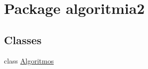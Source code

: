 \hypertarget{namespacealgoritmia2}{}\section{Package algoritmia2}
\label{namespacealgoritmia2}
\subsection*{Classes}
\begin{DoxyCompactItemize}
\item 
class \mbox{\hyperlink{classalgoritmia2_1_1_algoritmos}{Algoritmos}}
\end{DoxyCompactItemize}
